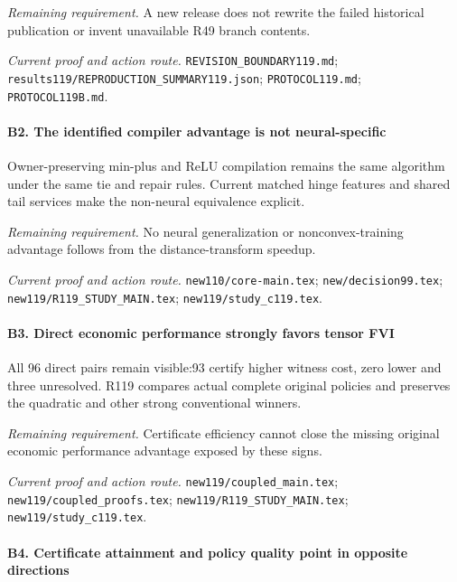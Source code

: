 \par\emph{Remaining requirement.} A new release does not rewrite the failed historical publication or invent unavailable R49 branch contents.

\par\emph{Current proof and action route.} \nolinkurl{REVISION_BOUNDARY119.md}; \nolinkurl{results119/REPRODUCTION_SUMMARY119.json}; \nolinkurl{PROTOCOL119.md}; \nolinkurl{PROTOCOL119B.md}.

\paragraph{B2. The identified compiler advantage is not neural-specific}

Owner-preserving min-plus and ReLU compilation remains the same algorithm under the same tie and repair rules. Current matched hinge features and shared tail services make the non-neural equivalence explicit.

\par\emph{Remaining requirement.} No neural generalization or nonconvex-training advantage follows from the distance-transform speedup.

\par\emph{Current proof and action route.} \nolinkurl{new110/core-main.tex}; \nolinkurl{new/decision99.tex}; \nolinkurl{new119/R119_STUDY_MAIN.tex}; \nolinkurl{new119/study_c119.tex}.

\paragraph{B3. Direct economic performance strongly favors tensor FVI}

All 96 direct pairs remain visible:93 certify higher witness cost, zero lower and three unresolved. R119 compares actual complete original policies and preserves the quadratic and other strong conventional winners.

\par\emph{Remaining requirement.} Certificate efficiency cannot close the missing original economic performance advantage exposed by these signs.

\par\emph{Current proof and action route.} \nolinkurl{new119/coupled_main.tex}; \nolinkurl{new119/coupled_proofs.tex}; \nolinkurl{new119/R119_STUDY_MAIN.tex}; \nolinkurl{new119/study_c119.tex}.

\paragraph{B4. Certificate attainment and policy quality point in opposite directions}


